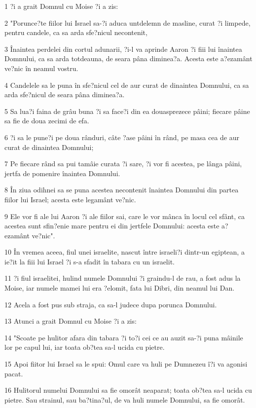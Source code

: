 \par 1 ?i a grait Domnul cu Moise ?i a zis:
\par 2 "Porunce?te fiilor lui Israel sa-?i aduca untdelemn de masline, curat ?i limpede, pentru candele, ca sa arda sfe?nicul necontenit,
\par 3 Înaintea perdelei din cortul adunarii, ?i-l va aprinde Aaron ?i fiii lui înaintea Domnului, ca sa arda totdeauna, de seara pâna diminea?a. Acesta este a?ezamânt ve?nic în neamul vostru.
\par 4 Candelele sa le puna în sfe?nicul cel de aur curat de dinaintea Domnului, ca sa arda sfe?nicul de seara pâna diminea?a.
\par 5 Sa lua?i faina de grâu buna ?i sa face?i din ea douasprezece pâini; fiecare pâine sa fie de doua zecimi de efa.
\par 6 ?i sa le pune?i pe doua rânduri, câte ?ase pâini în rând, pe masa cea de aur curat de dinaintea Domnului;
\par 7 Pe fiecare rând sa pui tamâie curata ?i sare, ?i vor fi acestea, pe lânga pâini, jertfa de pomenire înaintea Domnului.
\par 8 În ziua odihnei sa se puna acestea necontenit înaintea Domnului din partea fiilor lui Israel; acesta este legamânt ve?nic.
\par 9 Ele vor fi ale lui Aaron ?i ale fiilor sai, care le vor mânca în locul cel sfânt, ca acestea sunt sfin?enie mare pentru ei din jertfele Domnului: acesta este a?ezamânt ve?nic".
\par 10 În vremea aceea, fiul unei israelite, nascut între israeli?i dintr-un egiptean, a ie?it la fiii lui Israel ?i s-a sfadit în tabara cu un israelit.
\par 11 ?i fiul israelitei, hulind numele Domnului ?i graindu-l de rau, a fost adus la Moise, iar numele mamei lui era ?elomit, fata lui Dibri, din neamul lui Dan.
\par 12 Acela a fost pus sub straja, ca sa-l judece dupa porunca Domnului.
\par 13 Atunci a grait Domnul cu Moise ?i a zis:
\par 14 "Scoate pe hulitor afara din tabara ?i to?i cei ce au auzit sa-?i puna mâinile lor pe capul lui, iar toata ob?tea sa-l ucida cu pietre.
\par 15 Apoi fiitor lui Israel sa le spui: Omul care va huli pe Dumnezeu î?i va agonisi pacat.
\par 16 Hulitorul numelui Domnului sa fie omorât neaparat; toata ob?tea sa-l ucida cu pietre. Sau strainul, sau ba?tina?ul, de va huli numele Domnului, sa fie omorât.
